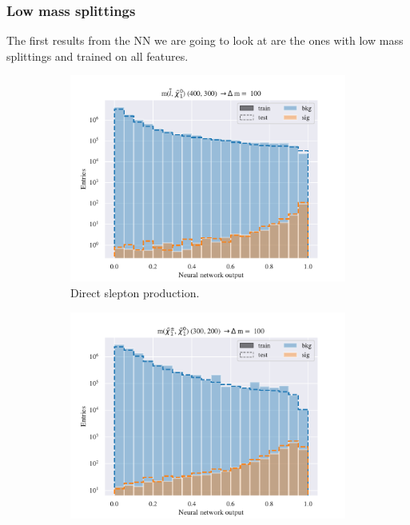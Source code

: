 \subsubsection{Low mass splittings}
The first results from the NN we are going to look at are the ones with low mass splittings and trained on all features. 

\begin{figure}[H]
    \centering
    \begin{subfigure}[t!]{0.49\textwidth}
        \includegraphics[width = \textwidth]{Figures/SlepSlep/ML/NN/All_level/Low/scaled_train_test_395984.pdf}
        \caption{Direct slepton production.}
        \label{fig:SlepslepNNLow}
    \end{subfigure}
    \begin{subfigure}[t!]{0.49\textwidth}
        \includegraphics[width = \textwidth]{Figures/SlepSnu/NN/All_level/Low/scaled_train_test_397115.pdf}

\end{subfigure}
\end{figure}
